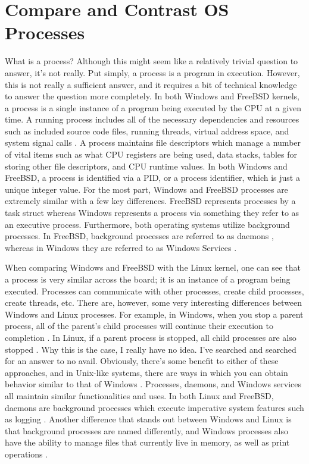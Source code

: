 \documentclass[letterpaper,10pt,draftclsnofoot,onecolumn]{IEEEtran}
\begin{document}
\section{Compare and Contrast OS Processes}
What is a process? Although this might seem like a relatively trivial question to answer, it’s not really. Put simply, a process is a program in execution. However, this is not really a sufficient answer, and it requires a bit of technical knowledge to answer the question more completely. In both Windows and FreeBSD kernels, a process is a single instance of a program being executed by the CPU at a given time. A running process includes all of the necessary dependencies and resources such as included source code files, running threads, virtual address space, and system signal calls \cite{MSWindows1} \cite{FreeBSD2}. A process maintains file descriptors which manage a number of vital items such as what CPU registers are being used, data stacks, tables for storing other file descriptors, and CPU runtime values. In both Windows and FreeBSD, a process is identified via a PID, or a process identifier, which is just a unique integer value. For the most part, Windows and FreeBSD processes are extremely similar with a few key differences. FreeBSD represents processes by a task struct whereas Windows represents a process via something they refer to as an executive process. Furthermore, both operating systems utilize background processes. In FreeBSD, background processes are referred to as daemons \cite{FreeBSD2}, whereas in Windows they are referred to as Windows Services \cite{MSWindows1}.

When comparing Windows and FreeBSD with the Linux kernel, one can see that a process is very similar across the board; it is an instance of a program being executed. Processes can communicate with other processes, create child processes, create threads, etc. There are, however, some very interesting differences between Windows and Linux processes. For example, in Windows, when you stop a parent process, all of the parent’s child processes will continue their execution to completion \cite{Processes}. In Linux, if a parent process is stopped, all child processes are also stopped \cite{Processes}. Why this is the case, I really have no idea. I’ve searched and searched for an answer to no avail. Obviously, there’s some benefit to either of these approaches, and in Unix-like systems, there are ways in which you can obtain behavior similar to that of Windows \cite{ProcessBehavior}. Processes, daemons, and Windows services all maintain similar functionalities and uses. In both Linux and FreeBSD, daemons are background processes which execute imperative system features such as logging \cite{FreeBSD2} \cite{Linux}. Another difference that stands out between Windows and Linux is that background processes are named differently, and Windows processes also have the ability to manage files that currently live in memory, as well as print operations \cite{MSWindows1}.\\
\\
\end{document}
